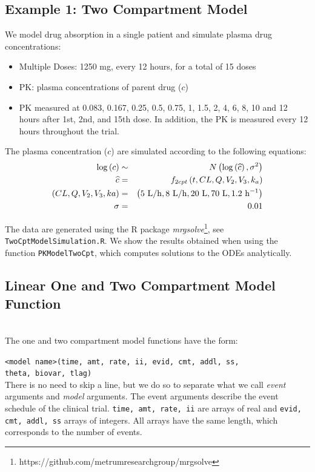 \documentclass[11pt]{amsart}
\begin{document}
\subsection{Example 1: Two Compartment Model}
We model drug absorption in a single patient and simulate plasma drug concentrations:
\begin{itemize}
  \item Multiple Doses: 1250 mg, every 12 hours, for a total of 15 doses
  \item PK: plasma concentrations of parent drug ($c$)
  \item PK measured at 0.083, 0.167, 0.25, 0.5, 0.75, 1, 1.5, 2, 4, 6, 8, 10 and 12 hours after 1st, 2nd, and 15th dose. In addition, the PK is measured every 12 hours throughout the trial.
\end{itemize}

The plasma concentration ($c$) are simulated according to the following equations:
\begin{eqnarray*}
\log\left(c\right) &\sim& N\left(\log\left(\widehat{c}\right),\sigma^2\right) \\
 \widehat{c} &=& f_{2cpt}\left(t, CL, Q, V_2, V_3, k_a\right) \\
  \left(CL, Q, V_2, V_3, ka\right) &=& 
	\left(5\ {\rm L/h}, 8\  {\rm L/h}, 20\  {\rm L},  70\ {\rm L}, 1.2\ {\rm h^{-1}} \right) \\
  \sigma &=& 0.01
\end{eqnarray*}

The data are generated using the R package \textit{mrgsolve}\footnote{https://github.com/metrumresearchgroup/mrgsolve}, see \texttt{TwoCptModelSimulation.R}. We show the results obtained when using the function \texttt{PKModelTwoCpt}, which computes solutions to the ODEs analytically.

\subsection{Linear One and Two Compartment Model Function} \ \\

The one and two compartment model functions have the form:

\texttt{<model name>(time, amt, rate, ii, evid, cmt, addl, ss,\\
\phantom{<model name>} theta,  biovar, tlag)} \\

There is no need to skip a line, but we do so to separate what we call \textit{event} arguments and \textit{model} arguments. The event arguments describe the event schedule of the clinical trial. \texttt{time, amt, rate, ii} are arrays of real and \texttt{evid, cmt, addl, ss} arrays of integers. All arrays have the same length, which corresponds to the number of events.
\end{document}
